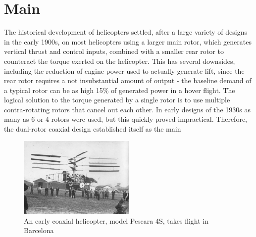 \documentclass[11pt, a4paper]{scrartcl}
\begin{document}
\section{Main\label{Main}}
The historical development of helicopters settled, after a large variety of designs in the early 1900s, on most helicopters using a larger main rotor, which generates vertical thrust and control inputs, combined with a smaller rear rotor to counteract the torque exerted on the helicopter. This has several downsides, including the reduction of engine power used to actually generate lift, since the rear rotor requires a not insubstantial amount of output - the baseline demand of a typical rotor can be as high 15\% of generated power in a hover flight.\cite{dries-2003} The logical solution to the torque generated by a single rotor is to use multiple contra-rotating rotors that cancel out each other. In early designs of the 1930s as many as 6 or 4 rotors were used,\cite{Pescara-1930} but this quickly proved impractical. Therefore, the dual-rotor coaxial design established itself as the main 

\begin{figure}
    \includegraphics[width=0.5\textwidth]{Early_Coaxial.jpg}
    \caption{An early coaxial helicopter, model Pescara 4S, takes flight in Barcelona}
\end{figure}
\vspace{1cm}

\printbibliography
\end{document}
